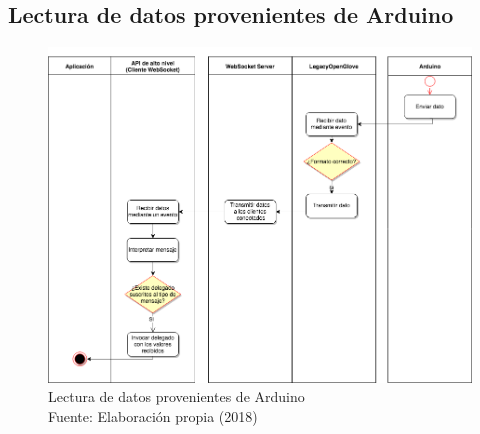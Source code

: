 \subsection{Lectura de datos provenientes de Arduino}

\begin{figure}[H]
  \begin{center} 
   	\includegraphics[width=1.0\textwidth]{images/chapter04/ActivityDiagrams-ReadDataFromArduino.png} 
    \caption[Lectura de datos provenientes de Arduino]{Lectura de datos provenientes de Arduino \\Fuente: Elaboración propia (2018)}
    \label{fig:activity-diagrams06-ReadDataFromArduino}
  \end{center}
\end{figure}
